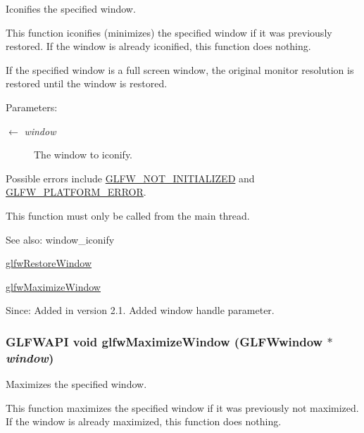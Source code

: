 Iconifies the specified window. 

This function iconifies (minimizes) the specified window if it was previously restored. If the window is already iconified, this function does nothing.

If the specified window is a full screen window, the original monitor resolution is restored until the window is restored.

\begin{Desc}
\item[Parameters:]
\begin{description}
\item[\mbox{$\leftarrow$} {\em window}]The window to iconify.\end{description}
\end{Desc}
Possible errors include \hyperlink{group__errors_g2374ee02c177f12e1fa76ff3ed15e14a}{GLFW\_\-NOT\_\-INITIALIZED} and \hyperlink{group__errors_gd44162d78100ea5e87cdd38426b8c7a1}{GLFW\_\-PLATFORM\_\-ERROR}.

This function must only be called from the main thread.

\begin{Desc}
\item[See also:]window\_\-iconify 

\hyperlink{group__window_g1e29caf0b819f578b04db52fff17256c}{glfwRestoreWindow} 

\hyperlink{group__window_g4f825a55367d3fabde3d06e7f30128e8}{glfwMaximizeWindow}\end{Desc}
\begin{Desc}
\item[Since:]Added in version 2.1.  Added window handle parameter. \end{Desc}
\hypertarget{group__window_g4f825a55367d3fabde3d06e7f30128e8}{
\subsubsection[glfwMaximizeWindow]{\setlength{\rightskip}{0pt plus 5cm}GLFWAPI void glfwMaximizeWindow ({\bf GLFWwindow} $\ast$ {\em window})}}
\label{group__window_g4f825a55367d3fabde3d06e7f30128e8}


Maximizes the specified window. 

This function maximizes the specified window if it was previously not maximized. If the window is already maximized, this function does nothing.

